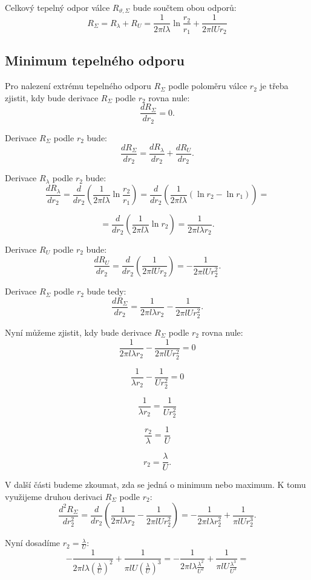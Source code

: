 \documentclass{article}
\begin{document}
Celkový tepelný odpor válce $R_{\vartheta, \Sigma}$ bude součtem obou odporů:
$$
    R_\Sigma = R_\lambda + R_U = \frac{1}{2 \pi l \lambda} \ln \frac{r_2}{r_1} + \frac{1}{2 \pi l U r_2}
$$


\subsection{Minimum tepelného odporu}

Pro nalezení extrému tepelného odporu $R_\Sigma$ podle poloměru válce $r_2$ je třeba zjistit, kdy bude derivace $R_\Sigma$ podle $r_2$ rovna nule:
$$
    \frac{dR_\Sigma}{dr_2} = 0.
$$

Derivace $R_\Sigma$ podle $r_2$ bude:
$$
    \frac{dR_\Sigma}{dr_2} = \frac{dR_\lambda}{dr_2} + \frac{dR_U}{dr_2}.
$$

Derivace $R_\lambda$ podle $r_2$ bude:
$$
    \frac{dR_\lambda}{dr_2} = \frac{d}{dr_2} \left( \frac{1}{2 \pi l \lambda} \ln \frac{r_2}{r_1} \right) = \frac{d}{dr_2} \left( \frac{1}{2 \pi l \lambda} \left(\ln r_2 - \ln r_1 \right) \right) =
$$

$$
    = \frac{d}{dr_2} \left( \frac{1}{2 \pi l \lambda} \ln r_2 \right) = \frac{1}{2 \pi l \lambda r_2}.
$$

Derivace $R_U$ podle $r_2$ bude:
$$
    \frac{dR_U}{dr_2} = \frac{d}{dr_2} \left( \frac{1}{2 \pi l U r_2} \right) = -\frac{1}{2 \pi l U r_2^2}.
$$

Derivace $R_\Sigma$ podle $r_2$ bude tedy:
$$
    \frac{dR_\Sigma}{dr_2} = \frac{1}{2 \pi l \lambda r_2} - \frac{1}{2 \pi l U r_2^2}.
$$

Nyní můžeme zjistit, kdy bude derivace $R_\Sigma$ podle $r_2$ rovna nule:
$$
    \frac{1}{2 \pi l \lambda r_2} - \frac{1}{2 \pi l U r_2^2} = 0
$$

$$
    \frac{1}{\lambda r_2} - \frac{1}{U r_2^2} = 0
$$

$$
    \frac{1}{\lambda r_2} = \frac{1}{U r_2^2}
$$

$$
    \frac{r_2}{\lambda} = \frac{1}{U}
$$

$$
    r_2 = \frac{\lambda}{U}.
$$

V další části budeme zkoumat, zda se jedná o minimum nebo maximum. K tomu využijeme druhou derivaci $R_\Sigma$ podle $r_2$:
$$
    \frac{d^2R_\Sigma}{dr_2^2} = \frac{d}{dr_2} \left( \frac{1}{2 \pi l \lambda r_2} - \frac{1}{2 \pi l U r_2^2} \right) = -\frac{1}{2 \pi l \lambda r_2^2} + \frac{1}{\pi l U r_2^3}.
$$

Nyní dosadíme $r_2 = \frac{\lambda}{U}$:
$$
    -\frac{1}{2 \pi l \lambda \left( \frac{\lambda}{U} \right)^2} + \frac{1}{\pi l U \left( \frac{\lambda}{U} \right)^3} = -\frac{1}{2 \pi l \lambda \frac{\lambda^2}{U^2}} + \frac{1}{\pi l U \frac{\lambda^3}{U^3}} =
$$
\end{document}
